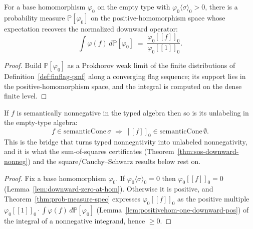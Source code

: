 \begin{theorem}
  \label{thm:random-hom-measure}
  \leanok
  For a base homomorphism $\varphi_0$ on the empty type with
  $\varphi_0\langle\sigma\rangle_0 > 0$, there is a probability measure
  $\mathbb{P}[\varphi_0]$ on the positive-homomorphism space whose expectation
  recovers the normalized downward operator:
  \[ \int \varphi(f)\, d\mathbb{P}[\varphi_0]
     \;=\; \frac{\varphi_0[\![f]\!]_0}{\varphi_0[\![1]\!]_0}. \]
\end{theorem}
\begin{proof}\leanok
  Build $\mathbb{P}[\varphi_0]$ as a Prokhorov weak limit of the finite
  distributions of Definition~\ref{def:finflag-pmf} along a converging flag
  sequence; its support lies in the positive-homomorphism space, and the integral
  is computed on the dense finite level.
\end{proof}

\begin{theorem}
  \label{thm:downward-preserve-cone}
  \leanok
  If $f$ is semantically nonnegative in the typed algebra then so is its
  unlabeling in the empty-type algebra:
  \[ f \in \mathrm{semanticCone}\,\sigma \;\Longrightarrow\;
     [\![f]\!]_0 \in \mathrm{semanticCone}\,\emptyset. \]
  This is the bridge that turns typed nonnegativity into unlabeled
  nonnegativity, and it is what the sum-of-squares certificates
  (Theorem~\ref{thm:sos-downward-nonneg}) and the square/Cauchy--Schwarz results
  below rest on.
\end{theorem}
\begin{proof}\leanok
  Fix a base homomorphism $\varphi_0$. If $\varphi_0\langle\sigma\rangle_0 = 0$
  then $\varphi_0[\![f]\!]_0 = 0$ (Lemma~\ref{lem:downward-zero-at-hom}).
  Otherwise it is positive, and Theorem~\ref{thm:prob-measure-spec} expresses
  $\varphi_0[\![f]\!]_0$ as the positive multiple
  $\varphi_0[\![1]\!]_0 \cdot \int \varphi(f)\, d\mathbb{P}[\varphi_0]$
  (Lemma~\ref{lem:positivehom-one-downward-pos}) of the integral of a nonnegative
  integrand, hence $\ge 0$.
\end{proof}

